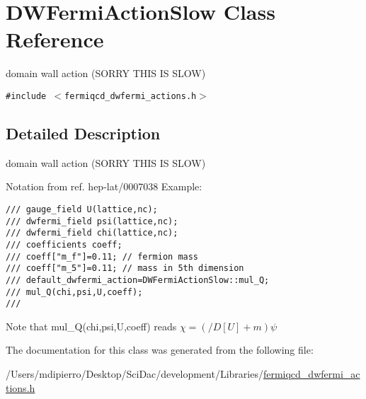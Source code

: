 \hypertarget{class_d_w_fermi_action_slow}{
\section{DWFermiActionSlow Class Reference}
\label{class_d_w_fermi_action_slow}
}
domain wall action (SORRY THIS IS SLOW)  


{\tt \#include $<$fermiqcd\_\-dwfermi\_\-actions.h$>$}



\subsection{Detailed Description}
domain wall action (SORRY THIS IS SLOW) 

Notation from ref. hep-lat/0007038 Example: 

\footnotesize\begin{verbatim}
/// gauge_field U(lattice,nc);
/// dwfermi_field psi(lattice,nc);
/// dwfermi_field chi(lattice,nc);
/// coefficients coeff;
/// coeff["m_f"]=0.11; // fermion mass
/// coeff["m_5"]=0.11; // mass in 5th dimension
/// default_dwfermi_action=DWFermiActionSlow::mul_Q;
/// mul_Q(chi,psi,U,coeff);
/// \end{verbatim}
\normalsize
 Note that mul\_\-Q(chi,psi,U,coeff) reads $ \chi=(/\!\!\!D[U]+m)\psi $ 

The documentation for this class was generated from the following file:\begin{CompactItemize}
\item 
/Users/mdipierro/Desktop/SciDac/development/Libraries/\hyperlink{fermiqcd__dwfermi__actions_8h}{fermiqcd\_\-dwfermi\_\-actions.h}\end{CompactItemize}
